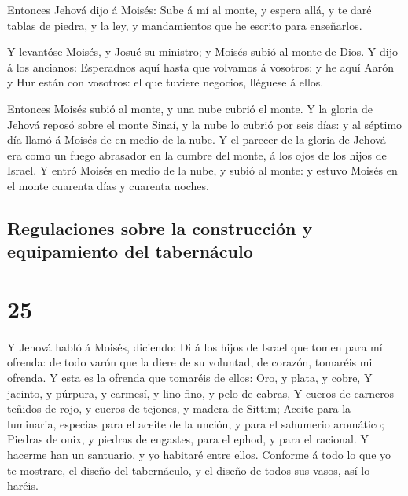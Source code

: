  Entonces Jehová dijo á Moisés: Sube á mí al monte, y
espera allá, y te daré tablas de piedra, y la ley, y mandamientos que he
escrito para enseñarlos.

 Y levantóse Moisés, y Josué su ministro; y Moisés subió
al monte de Dios.  Y dijo á los ancianos: Esperadnos aquí
hasta que volvamos á vosotros: y he aquí Aarón y Hur están con vosotros:
el que tuviere negocios, lléguese á ellos.

 Entonces Moisés subió al monte, y una nube cubrió el
monte.  Y la gloria de Jehová reposó sobre el monte
Sinaí, y la nube lo cubrió por seis días: y al séptimo día llamó á
Moisés de en medio de la nube.  Y el parecer de la gloria
de Jehová era como un fuego abrasador en la cumbre del monte, á los ojos
de los hijos de Israel.  Y entró Moisés en medio de la
nube, y subió al monte: y estuvo Moisés en el monte cuarenta días y
cuarenta noches.

\hypertarget{regulaciones-sobre-la-construcciuxf3n-y-equipamiento-del-tabernuxe1culo}{%
\subsection{Regulaciones sobre la construcción y equipamiento del
tabernáculo}\label{regulaciones-sobre-la-construcciuxf3n-y-equipamiento-del-tabernuxe1culo}}

\hypertarget{section-24}{%
\section{25}\label{section-24}}

 Y Jehová habló á Moisés, diciendo:  Di á
los hijos de Israel que tomen para mí ofrenda: de todo varón que la
diere de su voluntad, de corazón, tomaréis mi ofrenda.  Y
esta es la ofrenda que tomaréis de ellos: Oro, y plata, y cobre,
 Y jacinto, y púrpura, y carmesí, y lino fino, y pelo de
cabras,  Y cueros de carneros teñidos de rojo, y cueros de
tejones, y madera de Sittim;  Aceite para la luminaria,
especias para el aceite de la unción, y para el sahumerio aromático;
 Piedras de onix, y piedras de engastes, para el ephod, y
para el racional.  Y hacerme han un santuario, y yo
habitaré entre ellos.  Conforme á todo lo que yo te
mostrare, el diseño del tabernáculo, y el diseño de todos sus vasos, así
lo haréis.

